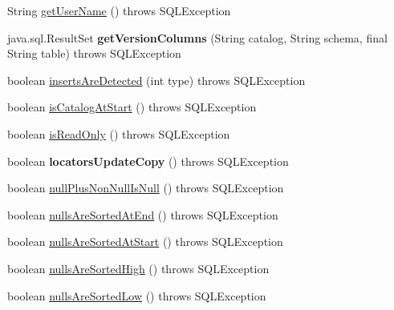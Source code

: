 \begin{DoxyCompactItemize}
\item 
String \mbox{\hyperlink{classcom_1_1mysql_1_1cj_1_1jdbc_1_1_database_meta_data_a9fe2eb13aa496f7a607a6c88d9f9fc8d}{get\+User\+Name}} ()  throws S\+Q\+L\+Exception 
\item 
\mbox{\label{classcom_1_1mysql_1_1cj_1_1jdbc_1_1_database_meta_data_acf5d600c5e4bd59cb60e90d355d439c4}} 
java.\+sql.\+Result\+Set {\bfseries get\+Version\+Columns} (String catalog, String schema, final String table)  throws S\+Q\+L\+Exception 
\item 
boolean \mbox{\hyperlink{classcom_1_1mysql_1_1cj_1_1jdbc_1_1_database_meta_data_ab83a53969a65b4a474c5ad0eac87ef4e}{inserts\+Are\+Detected}} (int type)  throws S\+Q\+L\+Exception 
\item 
boolean \mbox{\hyperlink{classcom_1_1mysql_1_1cj_1_1jdbc_1_1_database_meta_data_a661d7d6feb31152148b6cdcb5b6b2ead}{is\+Catalog\+At\+Start}} ()  throws S\+Q\+L\+Exception 
\item 
boolean \mbox{\hyperlink{classcom_1_1mysql_1_1cj_1_1jdbc_1_1_database_meta_data_ae2267f22cc38e6bce65f493e566760d1}{is\+Read\+Only}} ()  throws S\+Q\+L\+Exception 
\item 
\mbox{\label{classcom_1_1mysql_1_1cj_1_1jdbc_1_1_database_meta_data_ac78da02bca393ec069012d58109f562f}} 
boolean {\bfseries locators\+Update\+Copy} ()  throws S\+Q\+L\+Exception 
\item 
boolean \mbox{\hyperlink{classcom_1_1mysql_1_1cj_1_1jdbc_1_1_database_meta_data_a355965ebd17887a4761a872e0d6b359d}{null\+Plus\+Non\+Null\+Is\+Null}} ()  throws S\+Q\+L\+Exception 
\item 
boolean \mbox{\hyperlink{classcom_1_1mysql_1_1cj_1_1jdbc_1_1_database_meta_data_ad02ce86ef86f85d7f12d9d56c3bd07ae}{nulls\+Are\+Sorted\+At\+End}} ()  throws S\+Q\+L\+Exception 
\item 
boolean \mbox{\hyperlink{classcom_1_1mysql_1_1cj_1_1jdbc_1_1_database_meta_data_a9f5037c0ccef98ea87a91af0cf42c29c}{nulls\+Are\+Sorted\+At\+Start}} ()  throws S\+Q\+L\+Exception 
\item 
boolean \mbox{\hyperlink{classcom_1_1mysql_1_1cj_1_1jdbc_1_1_database_meta_data_ad87c8711db15505c80c215af9cf5107e}{nulls\+Are\+Sorted\+High}} ()  throws S\+Q\+L\+Exception 
\item 
boolean \mbox{\hyperlink{classcom_1_1mysql_1_1cj_1_1jdbc_1_1_database_meta_data_ac35f97e98a243859aba5bb5c60aee7fa}{nulls\+Are\+Sorted\+Low}} ()  throws S\+Q\+L\+Exception 

\end{DoxyCompactItemize}
